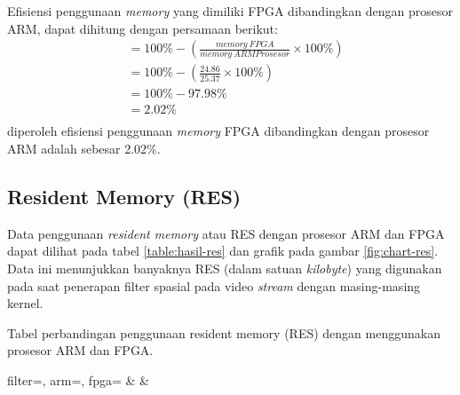 Efisiensi penggunaan \textit{memory} yang dimiliki FPGA dibandingkan dengan prosesor ARM, dapat dihitung dengan persamaan berikut:
\begin{equation*}
    \begin{split}
& = 100\% - \left( \frac{memory\ FPGA}{memory\ ARM Prosesor} \times 100\% \right) \\
& = 100\% - \left( \frac{24.86}{25.37} \times 100\% \right) \\
& = 100\% - 97.98\% \\
& = 2.02\% \\
    \end{split}
\end{equation*}
diperoleh efisiensi penggunaan \textit{memory} FPGA dibandingkan dengan prosesor ARM adalah sebesar 2.02\%.

\subsection{Resident Memory (RES)}

Data penggunaan \textit{resident memory} atau RES dengan prosesor ARM dan FPGA dapat dilihat pada tabel \ref{table:hasil-res} dan grafik pada gambar \ref{fig:chart-res}. Data ini menunjukkan banyaknya RES (dalam satuan \textit{kilobyte}) yang digunakan pada saat penerapan filter spasial pada video \textit{stream} dengan masing-masing kernel.

\begin{atable}
    \caption{Tabel perbandingan penggunaan resident memory (RES) dengan menggunakan prosesor ARM dan FPGA.}
    \label{table:hasil-res}
        {
            filter=\filter, 
            arm=\arm, 
            fpga=\fpga}
        {
            \filter & 
            \arm & 
            \fpga }
\end{atable}

